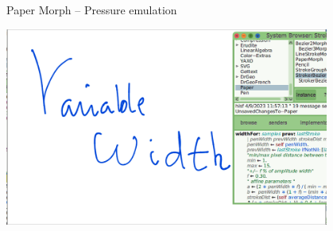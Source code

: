 \documentclass{beamer}
\begin{document}
%
\begin{frame}{Paper Morph -- Pressure emulation}
\begin{center}
  \includegraphics[width=0.8\textwidth]{image9.png}
\end{center}
\end{frame}
\end{document}

